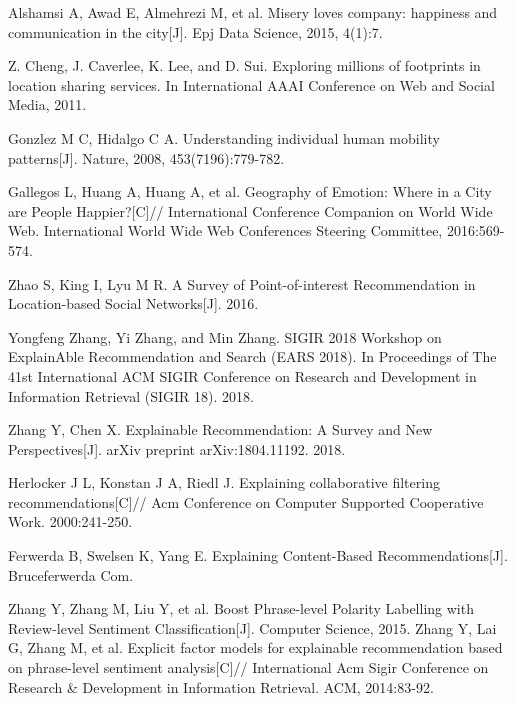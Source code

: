 \documentclass[runningheads]{llncs}
\begin{document}
\begin{thebibliography}{25}
Alshamsi A, Awad E, Almehrezi M, et al. Misery loves company: happiness and communication in the city[J]. Epj Data Science, 2015, 4(1):7.

Z. Cheng, J. Caverlee, K. Lee, and D. Sui. Exploring millions of footprints in location sharing services. In International AAAI Conference on Web and Social Media, 2011.

Gonzlez M C, Hidalgo C A. Understanding individual human mobility patterns[J]. Nature, 2008, 453(7196):779-782.

Gallegos L, Huang A, Huang A, et al. Geography of Emotion: Where in a City are People Happier?[C]// International Conference Companion on World Wide Web. International World Wide Web Conferences Steering Committee, 2016:569-574.

Zhao S, King I, Lyu M R. A Survey of Point-of-interest Recommendation in Location-based Social Networks[J]. 2016.

Yongfeng Zhang, Yi Zhang, and Min Zhang. SIGIR 2018 Workshop on ExplainAble Recommendation and Search (EARS 2018). In Proceedings of The 41st International ACM SIGIR Conference on Research and Development in Information Retrieval (SIGIR 18). 2018.

 Zhang Y, Chen X. Explainable Recommendation: A Survey and New Perspectives[J]. arXiv preprint arXiv:1804.11192. 2018.
  
 Herlocker J L, Konstan J A, Riedl J. Explaining collaborative filtering recommendations[C]// Acm Conference on Computer Supported Cooperative Work. 2000:241-250.
 
 Ferwerda B, Swelsen K, Yang E. Explaining Content-Based Recommendations[J]. Bruceferwerda Com.
 
  Zhang Y, Zhang M, Liu Y, et al. Boost Phrase-level Polarity Labelling with Review-level Sentiment Classification[J]. Computer Science, 2015.
    Zhang Y, Lai G, Zhang M, et al. Explicit factor models for explainable recommendation based on phrase-level sentiment analysis[C]// International Acm Sigir Conference on Research \& Development in Information Retrieval. ACM, 2014:83-92.


\end{thebibliography}
\end{document}
